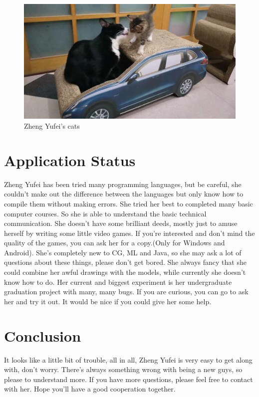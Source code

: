 \documentclass[a4]{jarticle}
\begin{document}
    \begin{figure}
        \begin{center}
            \centering
            \includegraphics[width=\linewidth]{cats.jpg}
            \caption{Zheng Yufei's cats}
            \label{fig:mcmthesis-logo}
        \end{center}
    \end{figure}

    \section{Application Status}
    Zheng Yufei has been tried many programming
    languages, but be careful, she
    couldn't make out the difference between the languages but only know how
    to compile them without making errors. She tried her best to completed many basic computer courses. So she is able
    to understand the basic technical communication. She doesn't have some brilliant
    deeds, mostly just to amuse herself by writing some little video games.
    If you're interested and don't mind the quality of the games, you can ask her
    for a copy.(Only for Windows and Android). She's completely new to CG, ML and
    Java, so she may ask a lot of questions about these things, please don't get
    bored. She always fancy that she could combine her awful drawings with the
    models, while currently she doesn't know how to do. Her current and
    biggest experiment is her undergraduate graduation project with many, many bugs.
    If you are curious, you can go to ask her and try it out. It would be nice
    if you could give her some help.

    \section{Conclusion}

    It looks like a little bit of trouble, all in all, Zheng Yufei is
    very easy to get along with, don't worry. There's always something
    wrong with being a new guys, so please to understand more. If you
    have more questions, please feel free to contact with her.
    Hope you'll have a good cooperation together.
\end{document}
